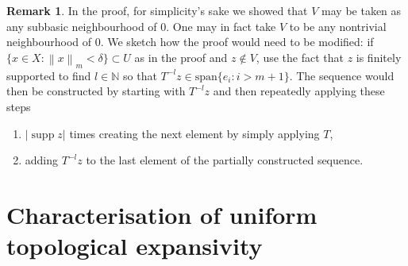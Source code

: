 \documentclass[11pt,a4paper]{amsart}
\theoremstyle{definition}
\newtheorem{remark}[theorem]{Remark}
\newcommand{\N}{\mathbb{N}}
\newcommand{\supp}{\operatorname{supp}}
\newcommand{\abs}[1]{\left| #1 \right|}
\newcommand{\norm}[1]{\left\| #1 \right\|}
\newcommand{\linsp}{\mathrm{span}}
\begin{document}
	\begin{remark}
		In the proof, for simplicity's sake we showed that $V$ may be taken as any subbasic neighbourhood of $0$. One may in fact take $V$ to be any nontrivial neighbourhood of $0$. We sketch how the proof would need to be modified: if $\{x \in X : \norm{x}_m < \delta\} \subset U$ as in the proof and $z \notin V$, use the fact that $z$ is finitely supported to find $l \in \N$ so that $T^{-l}z \in \linsp \{e_i : i > m+1\}$. The sequence would then be constructed by starting with $T^{-l}z$ and then repeatedly applying these steps
		\begin{enumerate}
			\item $\abs{\supp z}$ times creating the next element by simply applying $T$,
			\item adding $T^{-l}z$ to the last element of the partially constructed sequence.
		\end{enumerate}
	\end{remark}
	
	\section{Characterisation of uniform topological expansivity} \label{sect:UTE}
	
\end{document}
